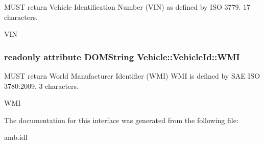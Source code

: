 M\-U\-S\-T return Vehicle Identification Number (V\-I\-N) as defined by I\-S\-O 3779. 17 characters. 

V\-I\-N \hypertarget{interfaceVehicle_1_1VehicleId_a1b58c3d71e2d7f99d401c25fa3d1d8c9}{
\subsubsection[{W\-M\-I}]{\setlength{\rightskip}{0pt plus 5cm}readonly attribute D\-O\-M\-String Vehicle\-::\-Vehicle\-Id\-::\-W\-M\-I}}\label{interfaceVehicle_1_1VehicleId_a1b58c3d71e2d7f99d401c25fa3d1d8c9}


M\-U\-S\-T return World Manufacturer Identifier (W\-M\-I) W\-M\-I is defined by S\-A\-E I\-S\-O 3780\-:2009. 3 characters. 

W\-M\-I 

The documentation for this interface was generated from the following file\-:\begin{DoxyCompactItemize}
\item 
amb.\-idl\end{DoxyCompactItemize}
